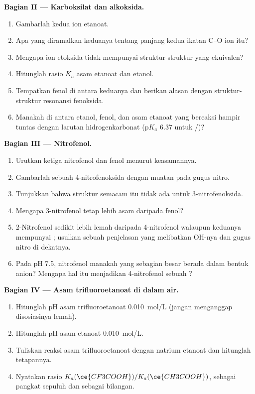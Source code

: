 \begin{problem}
\medskip
\noindent\textbf{Bagian II --- Karboksilat dan alkoksida.}
\begin{enumerate}[resume]
  \item Gambarlah kedua  ion etanoat.
  \item Apa yang diramalkan keduanya tentang panjang kedua ikatan C--O
        ion itu?
  \item Mengapa ion etoksida tidak mempunyai struktur-struktur yang
        ekuivalen?
  \item Hitunglah rasio $K_a$ asam etanoat dan etanol.
  \item Tempatkan fenol di antara keduanya dan berikan alasan dengan
        struktur-struktur resonansi fenoksida.
  \item Manakah di antara etanol, fenol, dan asam etanoat yang bereaksi
        hampir tuntas dengan larutan hidrogenkarbonat ($\mathrm{p}K_a$ 6.37
        untuk /)?
\end{enumerate}

\medskip
\noindent\textbf{Bagian III --- Nitrofenol.}
\begin{enumerate}[resume]
  \item Urutkan ketiga nitrofenol dan fenol menurut keasamannya.
  \item Gambarlah sebuah  4-nitrofenoksida dengan
        muatan pada gugus nitro.
  \item Tunjukkan bahwa struktur semacam itu tidak ada untuk
        3-nitrofenoksida.
  \item Mengapa 3-nitrofenol tetap lebih asam daripada fenol?
  \item 2-Nitrofenol sedikit lebih lemah daripada 4-nitrofenol walaupun
        keduanya mempunyai ; usulkan sebuah penjelasan yang
        melibatkan OH-nya dan gugus nitro di dekatnya.
  \item Pada pH 7.5, nitrofenol manakah yang sebagian besar berada dalam
        bentuk anion? Mengapa hal itu menjadikan 4-nitrofenol sebuah
        ?
\end{enumerate}

\medskip
\noindent\textbf{Bagian IV --- Asam trifluoroetanoat di dalam air.}
\begin{enumerate}[resume]
  \item Hitunglah pH asam trifluoroetanoat \qty{0.010}{mol/L} (jangan
        menganggap disosiasinya lemah).
  \item Hitunglah pH asam etanoat \qty{0.010}{mol/L}.
  \item Tuliskan reaksi asam trifluoroetanoat dengan natrium etanoat dan
        hitunglah tetapannya.
  \item Nyatakan rasio $K_a(\ce{CF3COOH})/K_a(\ce{CH3COOH})$, sebagai
        pangkat sepuluh dan sebagai bilangan.
\end{enumerate}
\end{problem}
